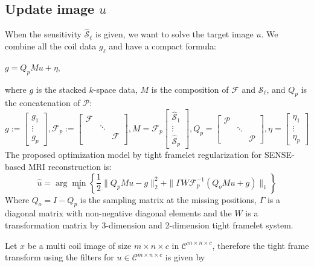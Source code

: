 \documentclass[preprint]{elsarticle}
\begin{document}
	\subsection{Update image $u$} When the sensitivity $\mathcal{\hat{S}}_{\ell}$ is given, we want to solve the target image $u$.
	We combine all the coil data $g_{\ell}$ and have a compact formula:
	\begin{center}\label{eq:SENSE-ObsModel_Toget}
		$g=Q_{p}Mu+\eta$,
		\par\end{center}
	where $g$ is the stacked $k$-space data, $M$ is the composition of
	$\mathcal{F}$ and $\mathcal{S}_{\ell}$, and $Q_{p}$ is the concatenation of $ \mathcal{P}$:
	$$ g:=\left[\begin{array}{c}
		g_{1}\\
		\vdots\\
		g_{p}
	\end{array}\right],\mathcal{F}_p:=\left[
	\begin{array}{ccc}
		\mathcal{F} & \: & \: \\
		\: & \ddots & \: \\
		\: & \:  & \mathcal{F} \\
	\end{array}
	\right], M=\mathcal{F}_p\left[\begin{array}{c}
		\mathcal{\hat{S}}_{1}\\
		\vdots\\
		\mathcal{\hat{S}}_{p}
	\end{array}\right],Q_{p}=\left[\begin{array}{ccc}
		\mathcal{P} &  & \\
		& \ddots & \\
		& \ &  \mathcal{P}
	\end{array}\right],\eta=\left[\begin{array}{c}
		\eta_{1}\\
		\vdots\\
		\eta_{p}
	\end{array}\right]$$
	The proposed optimization model by  tight framelet regularization  for SENSE-based MRI reconstruction is:
	\begin{equation}\label{mod:SENSE-ObsModel_3DReg}
		\hat{u}=\arg\min_{u}\left\{ \frac{1}{2}\| Q_{p}Mu-g \|_{2}^{2}+\| \Gamma W \mathcal{F}_p^{-1}(Q_{o}Mu+g)\| _{1}\right\}
	\end{equation}
	Where $Q_{o}= I-Q_{p}$ is the sampling matrix at the missing positions,  $\Gamma$ is a diagonal matrix with non-negative diagonal elements and the $W$ is a transformation matrix by 3-dimension and 2-dimension tight framelet system. 
	\par Let $x$ be a multi coil image of size $m \times n \times c$ in $\mathcal{C}^{m \times n \times c}$, therefore the  tight frame transform using the filters for $u \in \mathcal{C}^{m \times n \times c}$ is given by
	
\end{document}
